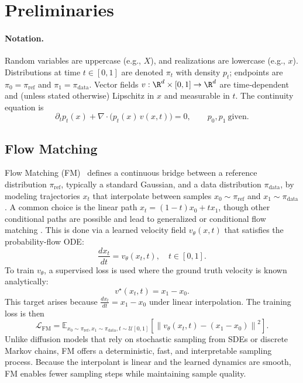 \documentclass{article}
\begin{document}
\section{Preliminaries}
\label{sec:preliminaries}

\paragraph{Notation.} Random variables are uppercase (e.g., $X$), and realizations are lowercase (e.g., $x$). Distributions at time $t\in[0,1]$ are denoted $\pi_t$ with density $p_t$; endpoints are $\pi_0=\pi_{\mathrm{ref}}$ and $\pi_1=\pi_{\mathrm{data}}$. Vector fields $v:\R^d\times[0,1]\to\R^d$ are time‑dependent and (unless stated otherwise) Lipschitz in $x$ and measurable in $t$. The continuity equation is
\begin{equation}
\label{eq:continuity}
\partial_t p_t(x) + \nabla\!\cdot\!\big(p_t(x)\,v(x,t)\big)=0,\qquad p_0,p_1\ \text{given}.
\end{equation}

\subsection{Flow Matching}

Flow Matching (FM)~\cite{lipman2023fm} defines a continuous bridge between a reference distribution \(\pi_{\mathrm{ref}}\), typically a standard Gaussian, and a data distribution \(\pi_{\mathrm{data}}\), by modeling trajectories \(x_t\) that interpolate between samples \(x_0 \sim \pi_{\mathrm{ref}}\) and \(x_1 \sim \pi_{\mathrm{data}}\). A common choice is the linear path $x_t = (1-t)x_0 + tx_1$, though other conditional paths are possible and lead to generalized or conditional flow matching \cite{tong2024otfm, song2021score, albergo2023stochastic_interpolants}. This is done via a learned velocity field \(v_\theta(x, t)\) that satisfies the probability-flow ODE:
\[
\frac{dx_t}{dt} = v_\theta(x_t, t), \quad t \in [0,1].
\]
To train \(v_\theta\), a supervised loss is used where the ground truth velocity is known analytically:
\[
v^\star(x_t, t) = x_1 - x_0.
\]
This target arises because \(\frac{dx_t}{dt} = x_1 - x_0\) under linear interpolation. The training loss is then
\[
\mathcal{L}_{\mathrm{FM}} = \mathbb{E}_{x_0 \sim \pi_{\mathrm{ref}}, x_1 \sim \pi_{\mathrm{data}}, t \sim \mathcal{U}[0,1]} \left[ \left\| v_\theta(x_t, t) - (x_1 - x_0) \right\|^2 \right].
\]
Unlike diffusion models that rely on stochastic sampling from SDEs or discrete Markov chains, FM offers a deterministic, fast, and interpretable sampling process. Because the interpolant is linear and the learned dynamics are smooth, FM enables fewer sampling steps while maintaining sample quality.
\end{document}
